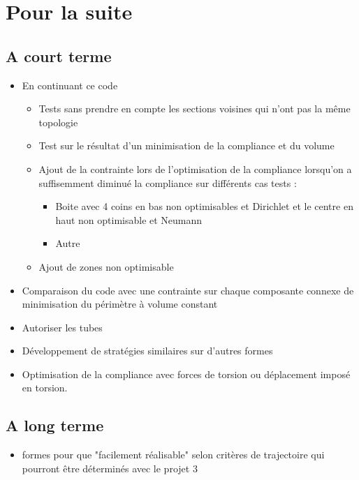 \documentclass[11pt,a4paper]{article}
\begin{document}
\section{Pour la suite}
\subsection{A court terme}
\begin{itemize}
	\item En continuant ce code 
		\begin{itemize}
			\item Tests sans prendre en compte les sections voisines qui n'ont pas la même topologie
			\item Test sur le résultat d'un minimisation de la compliance et du volume
			\item Ajout de la contrainte lors de l'optimisation de la compliance lorsqu'on a suffisemment diminué la compliance sur différents cas tests :
			\begin{itemize}
				\item Boite avec 4 coins en bas non optimisables et Dirichlet et le centre en haut non optimisable et Neumann
				\item Autre
			\end{itemize}
			\item Ajout de zones non optimisable
		\end{itemize}
	\item Comparaison du code avec une contrainte sur chaque composante connexe de minimisation du périmètre à volume constant
	\item Autoriser les tubes
	\item Développement de stratégies similaires sur d'autres formes
	\item Optimisation de la compliance avec forces de torsion ou déplacement imposé en torsion.		
\end{itemize}

\subsection{A long terme}
\begin{itemize}
	\item formes pour que "facilement réalisable" selon critères de trajectoire qui pourront être déterminés avec le projet 3
\end{itemize}
\end{document}
